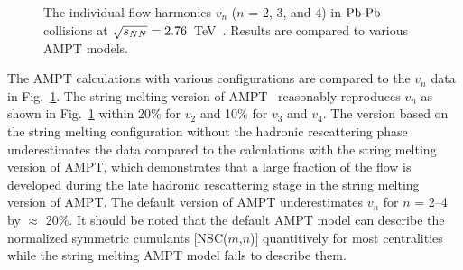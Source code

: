 \begin{figure}[h]
\begin{center}
        \caption{The individual flow harmonics $v_n$ ($n$ = 2, 3, and 4) in $\textnormal{Pb-Pb}$ collisions at $\sqrt{s_{NN}}=2.76$~TeV~\cite{Adam:2016izf}. Results are compared to various AMPT models.}
        \label{fig:Figure_A3}
              \end{center}
\end{figure}

The AMPT calculations with various configurations are compared to the $v_n$ data in Fig.~\ref{fig:Figure_A3}.
The string melting version of AMPT~\cite{Lin:2001zk,Lin:2004en} reasonably reproduces $v_n$ as shown in Fig.~\ref{fig:Figure_A3} within 20\% for $v_2$ and 10\% for $v_3$ and $v_4$. The version based on the string melting configuration without the hadronic rescattering phase underestimates the data compared to the calculations with the string melting version of AMPT, which demonstrates that a large fraction of the flow is developed during the late hadronic rescattering stage in the string melting version of AMPT.
The default version of AMPT underestimates $v_n$ for $n$ = 2--4 by $\approx$ 20\%. It should be noted that the default AMPT model can describe the normalized symmetric cumulants [NSC($m$,$n$)] quantitively for most centralities while the string melting AMPT model fails to describe them.

